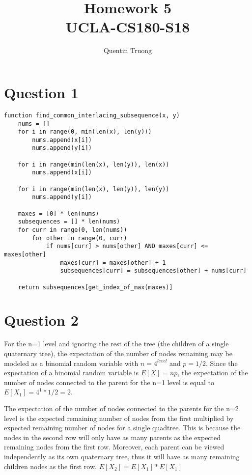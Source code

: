 \documentclass[11pt, oneside]{article}
\title{Homework 5\\UCLA-CS180-S18}
\author{Quentin Truong}
\begin{document}
\maketitle
{}


\section{Question 1}

\begin{lstlisting}
function find_common_interlacing_subsequence(x, y)
    nums = []
    for i in range(0, min(len(x), len(y)))
        nums.append(x[i])
        nums.append(y[i])

    for i in range(min(len(x), len(y)), len(x))
        nums.append(x[i])

    for i in range(min(len(x), len(y)), len(y))
        nums.append(y[i])

    maxes = [0] * len(nums)
    subsequences = [] * len(nums)
    for curr in range(0, len(nums))
        for other in range(0, curr)
            if nums[curr] > nums[other] AND maxes[curr] <= maxes[other]
                maxes[curr] = maxes[other] + 1
                subsequences[curr] = subsequences[other] + nums[curr]

    return subsequences[get_index_of_max(maxes)]
\end{lstlisting}

\clearpage

\section{Question 2}

For the n=1 level and ignoring the rest of the tree (the children of a single quaternary tree), the expectation of the number of nodes remaining may be modeled as a binomial random variable with $n = 4^{level}$ and $p = 1/2$. Since the expectation of a binomial random variable is $E[X] = np$, the expectation of the number of nodes connected to the parent for the n=1 level is equal to $E[X_1] = 4^1 * 1/2 = 2$. \newline

The expectation of the number of nodes connected to the parents for the n=2 level is the expected remaining number of nodes from the first multiplied by expected remaining number of nodes for a single quadtree. This is because the nodes in the second row will only have as many parents as the expected remaining nodes from the first row. Moreover, each parent can be viewed independently as its own quaternary tree, thus it will have as many remaining children nodes as the first row. $E[X_2] = E[X_1] * E[X_1]$ \newline
\end{document}
